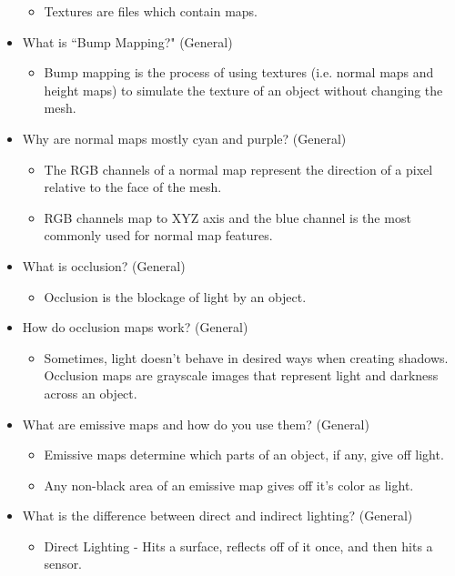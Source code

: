 \documentclass{article}
\begin{document}
\begin{itemize}
\begin{itemize}
        \item Textures are files which contain maps.
    \end{itemize}
    \item What is ``Bump Mapping?" (General)
    \begin{itemize}
        \item Bump mapping is the process of using textures (i.e. normal maps and height maps) to simulate the texture of an object without changing the mesh.
    \end{itemize}
    \item Why are normal maps mostly cyan and purple? (General)
    \begin{itemize}
        \item The RGB channels of a normal map represent the direction of a pixel relative to the face of the mesh.
        \item RGB channels map to XYZ axis and the blue channel is the most commonly used for normal map features.
    \end{itemize}
     \item What is occlusion? (General)
    \begin{itemize}
        \item Occlusion is the blockage of light by an object.
    \end{itemize}
    \item How do occlusion maps work? (General)
    \begin{itemize}
        \item Sometimes, light doesn't behave in desired ways when creating shadows. Occlusion maps are grayscale images that represent light and darkness across an object.
    \end{itemize}
     \item What are emissive maps and how do you use them? (General)
    \begin{itemize}
        \item Emissive maps determine which parts of an object, if any, give off light.
        \item Any non-black area of an emissive map gives off it's color as light.
    \end{itemize}
    \item What is the difference between direct and indirect lighting? (General)
    \begin{itemize}
        \item Direct Lighting - Hits a surface, reflects off of it once, and then hits a sensor.

\end{itemize}
\end{itemize}
\end{document}
